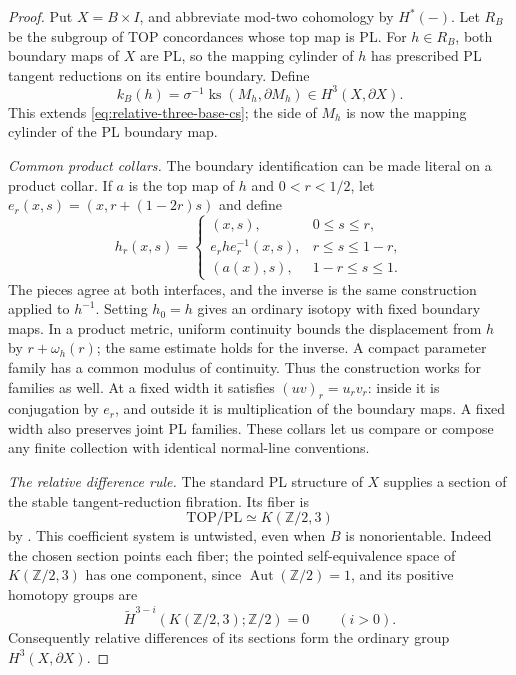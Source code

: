 \begin{proof}
Put $X=B\times I$, and abbreviate mod-two cohomology by
$H^*(-)$.  Let $R_B$ be the subgroup of TOP concordances
whose top map is PL.  For $h\in R_B$, both boundary maps of
$X$ are PL, so the mapping cylinder of $h$ has prescribed
PL tangent reductions on its entire boundary.  Define
\begin{equation}\label{eq:three-boundary-pl-class}
 k_B(h)=\sigma^{-1}\operatorname{ks}(M_h,\partial M_h)
                     \in H^3(X,\partial X).
\end{equation}
This extends \eqref{eq:relative-three-base-cs}; the side of
$M_h$ is now the mapping cylinder of the PL boundary map.

\emph{Common product collars.}
The boundary identification can be made literal on a product
collar.  If $a$ is the top map of $h$ and $0<r<1/2$, let
$e_r(x,s)=(x,r+(1-2r)s)$ and define
\[
 h_r(x,s)=
 \begin{cases}
  (x,s),&0\leq s\leq r,\\
  e_rhe_r^{-1}(x,s),&r\leq s\leq1-r,\\
  (a(x),s),&1-r\leq s\leq1.
 \end{cases}
\]
The pieces agree at both interfaces, and the inverse is the
same construction applied to $h^{-1}$.  Setting $h_0=h$
gives an ordinary isotopy with fixed boundary maps.  In a
product metric, uniform continuity bounds the displacement
from $h$ by $r+\omega_h(r)$; the same estimate holds for
the inverse.  A compact parameter family has a common
modulus of continuity.  Thus the construction works for
families as well.  At a fixed width it satisfies
$(uv)_r=u_rv_r$: inside it is conjugation by $e_r$, and
outside it is multiplication of the boundary maps.  A fixed
width also preserves joint PL families.  These collars let
us compare or compose any finite collection with identical
normal-line conventions.

\emph{The relative difference rule.}
The standard PL structure of $X$ supplies a section of the
stable tangent-reduction fibration.  Its fiber is
\[
 \mathrm{TOP}/\mathrm{PL}\simeq K(\mathbb Z/2,3)
\]
by \cite[Essay~V, Theorem~5.5(I), p.~251]{KirbySiebenmann1977}.
This coefficient system is untwisted, even when $B$ is
nonorientable.  Indeed the chosen section points each fiber;
the pointed self-equivalence space of $K(\mathbb Z/2,3)$
has one component, since $\operatorname{Aut}(\mathbb Z/2)=1$,
and its positive homotopy groups are
\[
 \widetilde H^{3-i}(K(\mathbb Z/2,3);\mathbb Z/2)=0
 \qquad(i>0).
\]
Consequently relative differences of its sections form the
ordinary group $H^3(X,\partial X)$.


\end{proof}
